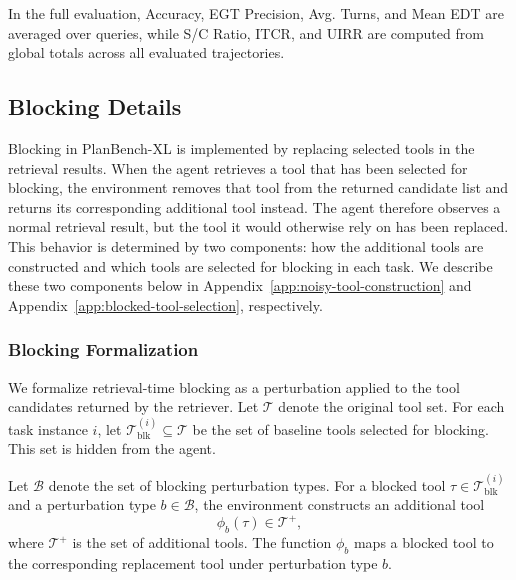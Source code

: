 \documentclass{llmxive}
\providecommand{\bench}[1]{PlanBench-XL}
\begin{document}
In the full evaluation, Accuracy, EGT Precision, Avg. Turns, and Mean EDT are averaged over queries, while S/C Ratio, ITCR, and UIRR are computed from global totals across all evaluated trajectories.

\subsection{Blocking Details}
\label{app:blocker-details}


Blocking in \bench{} is implemented by replacing selected tools in the retrieval results. 
When the agent retrieves a tool that has been selected for blocking, the environment removes that tool from the returned candidate list and returns its corresponding additional tool instead. 
The agent therefore observes a normal retrieval result, but the tool it would otherwise rely on has been replaced. 
This behavior is determined by two components: how the additional tools are constructed and which tools are selected for blocking in each task. 
We describe these two components below in Appendix~\ref{app:noisy-tool-construction} and Appendix~\ref{app:blocked-tool-selection}, respectively.

\subsubsection{Blocking Formalization}
\label{app:blocking-formalization}


We formalize retrieval-time blocking as a perturbation applied to the tool candidates returned by the retriever. 
Let $\mathcal{T}$ denote the original tool set. 
For each task instance $i$, let $\mathcal{T}^{(i)}_{\mathrm{blk}} \subseteq \mathcal{T}$ be the set of baseline tools selected for blocking. 
This set is hidden from the agent.

Let $\mathcal{B}$ denote the set of blocking perturbation types. 
For a blocked tool $\tau \in \mathcal{T}^{(i)}_{\mathrm{blk}}$ and a perturbation type $b \in \mathcal{B}$, the environment constructs an additional tool
\begin{equation}
\phi_b(\tau) \in \mathcal{T}^{+},
\end{equation}
where $\mathcal{T}^{+}$ is the set of additional tools. 
The function $\phi_b$ maps a blocked tool to the corresponding replacement tool under perturbation type $b$.
\end{document}
